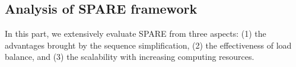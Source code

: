 

\subsection{Analysis of SPARE framework}
In this part, we extensively evaluate SPARE from three aspects:
(1) the advantages brought by the sequence simplification, (2) the effectiveness of load balance, and (3) the scalability with increasing computing resources.


